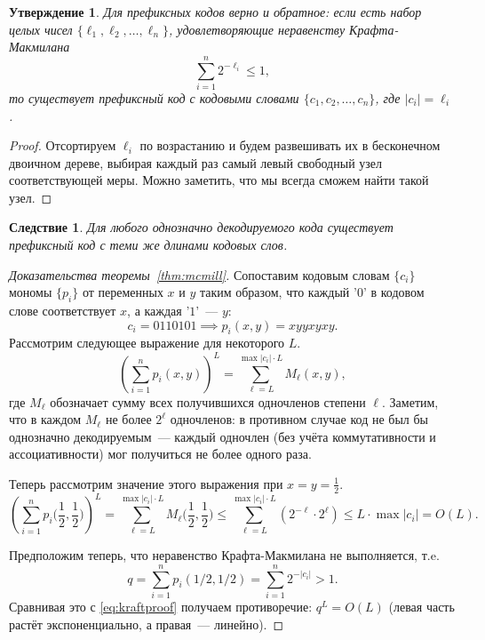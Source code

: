 \documentclass[12pt]{article}
\newcommand{\sshalf}{{\textstyle\frac12}}
\newcommand{\seqn}[2]{{#1}_1,{#1}_2,\dotsc,{#1}_{#2}}
\theoremstyle{definition}
\theoremstyle{plain}
\newtheorem{statement}{Утверждение}[section]
\newtheorem{corollary}{Следствие}[section]
\theoremstyle{remark}
\begin{document}
\begin{statement}
    Для префиксных кодов верно и обратное: если есть набор целых чисел
    \(\{\seqn{\ell}{n}\}\),
    удовлетворяющие неравенству Крафта-Макмилана
    \[
        \sum_{i=1}^{n} 2^{-\ell_i} \le 1,
    \]
    то существует префиксный код с кодовыми
    словами \(\{\seqn{c}{n}\}\), где \(|c_i| = \ell_i\).
\end{statement}
\begin{proof}
    Отсортируем $\ell_i$ по возрастанию и будем развешивать их в бесконечном
    двоичном дереве, выбирая каждый раз самый левый свободный узел
    соответствующей меры. Можно заметить, что мы всегда сможем найти такой узел.
\end{proof}
\begin{corollary}
    Для любого однозначно декодируемого кода существует префиксный код с теми же
    длинами кодовых слов.
\end{corollary}

\begin{proof}[Доказательства теоремы~\ref{thm:mcmill}]
    Сопоставим кодовым словам $\{c_i\}$ мономы $\{p_i\}$ от переменных $x$ и $y$ таким 
    образом, что каждый '$0$' в кодовом слове соответствует $x$, а каждая '$1$'~--- $y$:
    \[
        c_i = 0110101 \implies p_i(x,y) = xyyxyxy.
    \]
    Рассмотрим следующее выражение для некоторого $L$.
    \[
        \left( \sum_{i=1}^n p_i(x,y) \right)^L = \sum_{\ell=L}^{\max|c_i| \cdot
        L} M_\ell(x,y),
    \]
    где $M_\ell$ обозначает сумму всех получившихся одночленов степени $\ell$.
    Заметим, что в каждом $M_\ell$ не более $2^\ell$ одночленов: в противном
    случае код не был бы однозначно декодируемым~--- каждый одночлен (без учёта
    коммутативности и ассоциативности) мог получиться не более одного раза.
    
    Теперь рассмотрим значение этого выражения при \(x = y = \frac12\).
    \begin{equation}\label{eq:kraftproof}
        \left( \sum_{i=1}^n p_i\bigl(\sshalf,\sshalf\bigr) \right)^L =
        \sum_{\ell=L}^{\max|c_i| \cdot L} M_\ell\bigl(\sshalf,\sshalf\bigr) \le 
        \sum_{\ell=L}^{\max|c_i| \cdot L} (2^{-\ell} \cdot 2^\ell) \le 
        L\cdot\max|c_i| = O(L).
    \end{equation}

    Предположим теперь, что неравенство Крафта-Макмилана не выполняется, т.e.
    \[
        q = \sum_{i=1}^n p_i(1/2,1/2) = \sum_{i=1}^n 2^{-|c_i|} > 1.
    \]
    Сравнивая это с \eqref{eq:kraftproof} получаем противоречие:
    \(
        q^L = O(L)    
    \) 
    (левая часть растёт экспоненциально, а правая~— линейно).
\end{proof}
\end{document}
